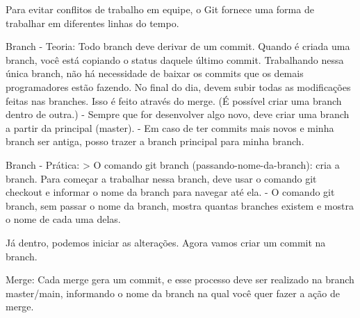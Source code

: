 Para evitar conflitos de trabalho em equipe, o Git fornece uma forma de trabalhar em diferentes linhas do tempo.

Branch - Teoria: Todo branch deve derivar de um commit. 
Quando é criada uma branch, você está copiando o status daquele último commit.
Trabalhando nessa única branch, não há necessidade de baixar os commits que os demais programadores estão fazendo.
No final do dia, devem subir todas as modificações feitas nas branches. Isso é feito através do merge.
(É possível criar uma branch dentro de outra.)
 - Sempre que for desenvolver algo novo, deve criar uma branch a partir da principal (master).
 - Em caso de ter commits mais novos e minha branch ser antiga, posso trazer a branch principal
   para minha branch.

Branch - Prática: 
> O comando git branch (passando-nome-da-branch): cria a branch. Para começar a trabalhar nessa branch, deve usar o comando
git checkout e informar o nome da branch para navegar até ela.
    - O comando git branch, sem passar o nome da branch, mostra quantas branches existem e mostra o nome de cada uma delas.

    Já dentro, podemos iniciar as alterações. Agora vamos criar um commit na branch.

Merge: Cada merge gera um commit, e esse processo deve ser realizado na branch master/main, informando o nome da branch 
na qual você quer fazer a ação de merge.